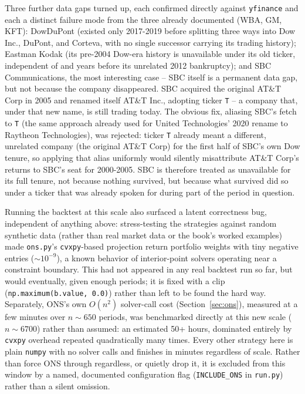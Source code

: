 \documentclass[11pt]{article}
\begin{document}
Three further data gaps turned up, each confirmed directly against
\texttt{yfinance} and each a distinct failure mode from the three
already documented (WBA, GM, KFT): DowDuPont (existed only 2017-2019
before splitting three ways into Dow Inc., DuPont, and Corteva, with no
single successor carrying its trading history); Eastman Kodak (its
pre-2004 Dow-era history is unavailable under its old ticker,
independent of and years before its unrelated 2012 bankruptcy); and SBC
Communications, the most interesting case -- SBC itself is a permanent
data gap, but not because the company disappeared. SBC acquired the
original AT\&T Corp in 2005 and renamed itself AT\&T Inc., adopting
ticker \texttt{T} -- a company that, under that new name, is still
trading today. The obvious fix, aliasing SBC's fetch to \texttt{T}
(the same approach already used for United Technologies' 2020 rename to
Raytheon Technologies), was rejected: ticker \texttt{T} already meant a
different, unrelated company (the original AT\&T Corp) for the first
half of SBC's own Dow tenure, so applying that alias uniformly would
silently misattribute AT\&T Corp's returns to SBC's seat for 2000-2005.
SBC is therefore treated as unavailable for its full tenure, not
because nothing survived, but because what survived did so under a
ticker that was already spoken for during part of the period in
question.

Running the backtest at this scale also surfaced a latent correctness
bug, independent of anything above: stress-testing the strategies
against random synthetic data (rather than real market data or the
book's worked examples) made \texttt{ons.py}'s \texttt{cvxpy}-based
projection return portfolio weights with tiny negative entries
($\sim\!10^{-9}$), a known behavior of interior-point solvers operating
near a constraint boundary. This had not appeared in any real backtest
run so far, but would eventually, given enough periods; it is fixed
with a clip (\texttt{np.maximum(b.value, 0.0)}) rather than left to be
found the hard way. Separately, ONS's own $O(n^2)$ solver-call cost
(Section~\ref{sec:ons}), measured at a few minutes over $n\!\sim\!650$
periods, was benchmarked directly at this new scale ($n\!\sim\!6700$)
rather than assumed: an estimated 50+ hours, dominated entirely by
\texttt{cvxpy} overhead repeated quadratically many times. Every other
strategy here is plain \texttt{numpy} with no solver calls and finishes
in minutes regardless of scale. Rather than force ONS through
regardless, or quietly drop it, it is excluded from this window by a
named, documented configuration flag (\texttt{INCLUDE\_ONS} in
\texttt{run.py}) rather than a silent omission.
\end{document}
